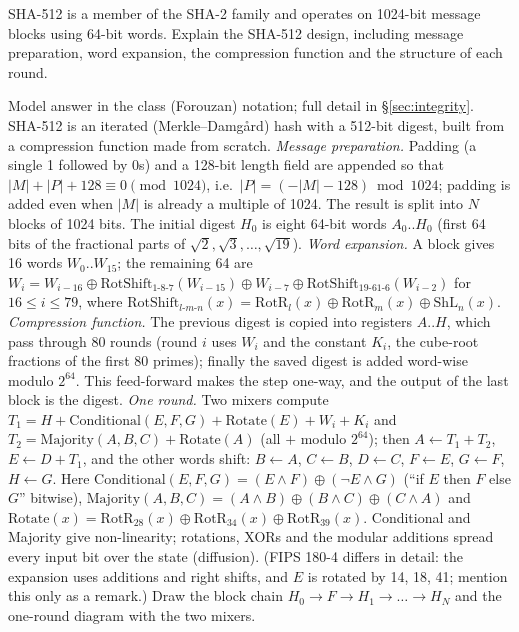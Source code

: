 \begin{keybox}[title={Q5 (7 marks)}]
SHA-512 is a member of the SHA-2 family and operates on 1024-bit message blocks using 64-bit words. Explain the SHA-512 design, including message preparation, word expansion, the compression function and the structure of each round.
\end{keybox}
Model answer in the class (Forouzan) notation; full detail in \S\ref{sec:integrity}. SHA-512 is an iterated (Merkle--Damg\aa rd) hash with a 512-bit digest, built from a compression function made from scratch.
\emph{Message preparation.} Padding (a single 1 followed by 0s) and a 128-bit length field are appended so that $|M| + |P| + 128 \equiv 0 \pmod{1024}$, i.e.\ $|P| = (-|M| - 128) \bmod 1024$; padding is added even when $|M|$ is already a multiple of 1024. The result is split into $N$ blocks of 1024 bits. The initial digest $H_0$ is eight 64-bit words $A_0..H_0$ (first 64 bits of the fractional parts of $\sqrt 2, \sqrt 3, \dots, \sqrt{19}$).
\emph{Word expansion.} A block gives 16 words $W_0..W_{15}$; the remaining 64 are $W_i = W_{i-16} \oplus \mathrm{RotShift}_{1\text{-}8\text{-}7}(W_{i-15}) \oplus W_{i-7} \oplus \mathrm{RotShift}_{19\text{-}61\text{-}6}(W_{i-2})$ for $16 \le i \le 79$, where $\mathrm{RotShift}_{l\text{-}m\text{-}n}(x) = \mathrm{RotR}_l(x) \oplus \mathrm{RotR}_m(x) \oplus \mathrm{ShL}_n(x)$.
\emph{Compression function.} The previous digest is copied into registers $A..H$, which pass through 80 rounds (round $i$ uses $W_i$ and the constant $K_i$, the cube-root fractions of the first 80 primes); finally the saved digest is added word-wise modulo $2^{64}$. This feed-forward makes the step one-way, and the output of the last block is the digest.
\emph{One round.} Two mixers compute $T_1 = H + \mathrm{Conditional}(E, F, G) + \mathrm{Rotate}(E) + W_i + K_i$ and $T_2 = \mathrm{Majority}(A, B, C) + \mathrm{Rotate}(A)$ (all $+$ modulo $2^{64}$); then $A \leftarrow T_1 + T_2$, $E \leftarrow D + T_1$, and the other words shift: $B \leftarrow A$, $C \leftarrow B$, $D \leftarrow C$, $F \leftarrow E$, $G \leftarrow F$, $H \leftarrow G$. Here $\mathrm{Conditional}(E, F, G) = (E \wedge F) \oplus (\neg E \wedge G)$ (``if $E$ then $F$ else $G$'' bitwise), $\mathrm{Majority}(A, B, C) = (A \wedge B) \oplus (B \wedge C) \oplus (C \wedge A)$ and $\mathrm{Rotate}(x) = \mathrm{RotR}_{28}(x) \oplus \mathrm{RotR}_{34}(x) \oplus \mathrm{RotR}_{39}(x)$. Conditional and Majority give non-linearity; rotations, XORs and the modular additions spread every input bit over the state (diffusion). (FIPS 180-4 differs in detail: the expansion uses additions and right shifts, and $E$ is rotated by 14, 18, 41; mention this only as a remark.) Draw the block chain $H_0 \to F \to H_1 \to \dots \to H_N$ and the one-round diagram with the two mixers.

